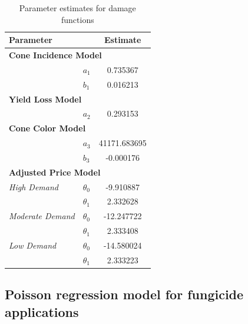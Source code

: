 \documentclass[10pt,a4paper]{article}
\begin{document}
\begin{table}[ht]
\centering
\caption{Parameter estimates for damage functions}
\label{tab:damage_function_parameters}
\small
\begin{tabular}{llc}
\toprule
\multicolumn{2}{l}{Parameter} & Estimate \\
\midrule
\multicolumn{3}{l}{\textbf{Cone Incidence Model}} \\
 & $a_1$ & 0.735367\\
 & $b_1$ & 0.016213\\
\multicolumn{3}{l}{\textbf{Yield Loss Model}} \\
 & $a_2$ & 0.293153\\
\multicolumn{3}{l}{\textbf{Cone Color Model}} \\
 & $a_3$ & 41171.683695\\
 & $b_3$ & -0.000176\\
\multicolumn{3}{l}{\textbf{Adjusted Price Model}} \\
\textit{High Demand} & $\theta_0$ & -9.910887\\
 & $\theta_1$ & 2.332628\\
\textit{Moderate Demand} & $\theta_0$ & -12.247722\\
 & $\theta_1$ & 2.333408\\
\textit{Low Demand} & $\theta_0$ & -14.580024\\
 & $\theta_1$ & 2.333223\\
\bottomrule
\end{tabular}
\end{table}


\subsection{Poisson regression model for fungicide applications}\label{sec:poisson_regression}
\end{document}
